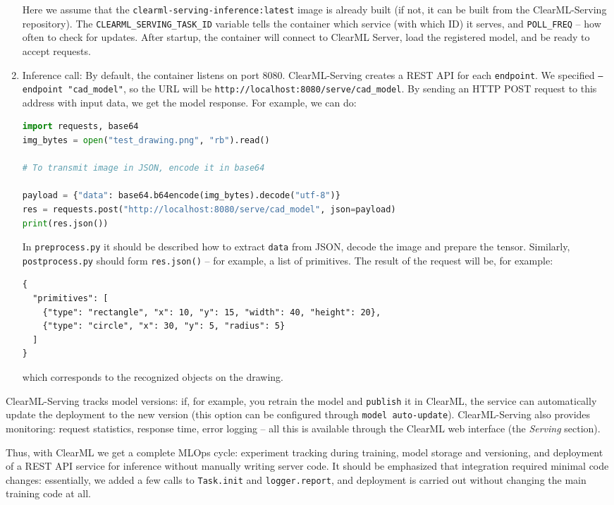 \documentclass{article}
\begin{document}
\begin{enumerate}
\begin{verbatim}
\end{verbatim}
Here we assume that the \texttt{clearml-serving-inference:latest} image is already built (if not, it can be built from the ClearML-Serving repository). The \texttt{CLEARML_SERVING_TASK_ID} variable tells the container which service (with which ID) it serves, and \texttt{POLL_FREQ} – how often to check for updates. After startup, the container will connect to ClearML Server, load the registered model, and be ready to accept requests.
\item Inference call: By default, the container listens on port 8080. ClearML-Serving creates a REST API for each \texttt{endpoint}. We specified \texttt{--endpoint "cad_model"}, so the URL will be \verb|http://localhost:8080/serve/cad_model|. By sending an HTTP POST request to this address with input data, we get the model response. For example, we can do:
\begin{lstlisting}[language=Python]
import requests, base64
img_bytes = open("test_drawing.png", "rb").read()

# To transmit image in JSON, encode it in base64

payload = {"data": base64.b64encode(img_bytes).decode("utf-8")}
res = requests.post("http://localhost:8080/serve/cad_model", json=payload)
print(res.json())
\end{lstlisting}
In \texttt{preprocess.py} it should be described how to extract \texttt{data} from JSON, decode the image and prepare the tensor. Similarly, \texttt{postprocess.py} should form \texttt{res.json()} – for example, a list of primitives. The result of the request will be, for example:
\begin{verbatim}
{
  "primitives": [
    {"type": "rectangle", "x": 10, "y": 15, "width": 40, "height": 20},
    {"type": "circle", "x": 30, "y": 5, "radius": 5}
  ]
}
\end{verbatim}
which corresponds to the recognized objects on the drawing.
\end{enumerate}

ClearML-Serving tracks model versions: if, for example, you retrain the model and \texttt{publish} it in ClearML, the service can automatically update the deployment to the new version (this option can be configured through \texttt{model auto-update}). ClearML-Serving also provides monitoring: request statistics, response time, error logging – all this is available through the ClearML web interface (the \textit{Serving} section).

Thus, with ClearML we get a complete MLOps cycle: experiment tracking during training, model storage and versioning, and deployment of a REST API service for inference without manually writing server code. It should be emphasized that integration required minimal code changes: essentially, we added a few calls to \texttt{Task.init} and \texttt{logger.report}, and deployment is carried out without changing the main training code at all.
\end{document}
